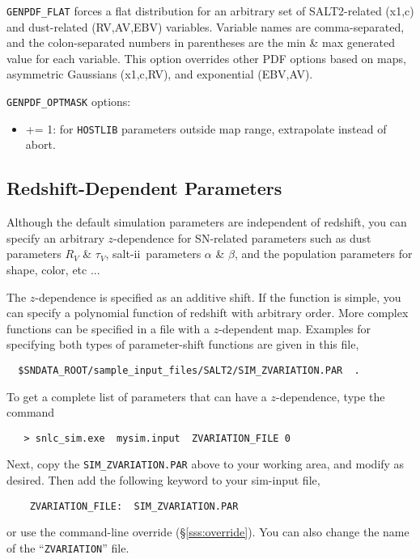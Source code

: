 \documentclass[12pt]{article}
\newcommand{\SALTII}{{\sc salt-ii}}
\begin{document}
\clearpage
{\tt GENPDF\_FLAT} forces a flat distribution for an arbitrary
set of SALT2-related (x1,c) and dust-related (RV,AV,EBV) variables.
Variable names are comma-separated, 
and the colon-separated numbers in parentheses are the 
min \& max generated value for each variable.
This option overrides other PDF options based on
maps, asymmetric Gaussians (x1,c,RV), and exponential (EBV,AV).

\medskip\noindent
{\tt GENPDF\_OPTMASK} options:
\begin{itemize}
  \item {+= 1:} for {\tt HOSTLIB} parameters outside map range,
       extrapolate instead of abort. 
\end{itemize}  


   \clearpage
   \subsection{Redshift-Dependent Parameters}
   \label{subsec:zvar}

Although the default simulation parameters are 
independent of redshift, you can specify an arbitrary 
$z$-dependence for SN-related parameters such as
dust parameters $R_V$ \& $\tau_V$, 
\SALTII\ parameters $\alpha$ \& $\beta$, and
the population parameters for shape, color, etc ...

The $z$-dependence is specified as an additive shift.
If the function is simple, you can specify a polynomial
function of redshift with arbitrary order.
More complex functions can be specified in a file with a $z$-dependent map.
Examples for specifying both types of parameter-shift 
functions are given in this file,
%
\begin{verbatim}
  $SNDATA_ROOT/sample_input_files/SALT2/SIM_ZVARIATION.PAR  .
\end{verbatim}
To get a complete list of parameters that can have a
$z$-dependence, type the command
\begin{verbatim}
   > snlc_sim.exe  mysim.input  ZVARIATION_FILE 0 
\end{verbatim}
%
Next, copy the {\tt SIM\_ZVARIATION.PAR} above to your working area,
and modify as desired. Then add the following keyword to 
your sim-input file,
\begin{verbatim}
    ZVARIATION_FILE:  SIM_ZVARIATION.PAR
\end{verbatim}
%
or use the command-line override (\S\ref{sss:override}).
You can also change the name of the ``{\tt ZVARIATION}'' file.
\end{document}
